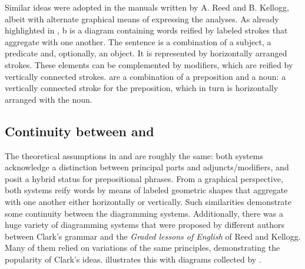 \documentclass[output=paper]{langsci/langscibook}
\begin{document}
Similar ideas were adopted in the manuals written by A. Reed and B. Kellogg, albeit with alternate graphical means of expressing the analyses. As already highlighted in , b is a diagram containing words reified by labeled strokes that aggregate with one another. The sentence is a combination of a subject, a predicate and, optionally, an object. It is represented by horizontally arranged strokes. These elements can be complemented by modifiers, which are reified by vertically connected strokes.  are a combination of a preposition and a noun: a vertically connected stroke for the preposition, which in turn is horizontally arranged with the noun. 

\subsection{Continuity between \citet{clark_science_1847} and \citet{reed_graded_1879}}\label{sec:4:3.2}

The theoretical assumptions in \citet{clark_science_1847} and \citet{reed_graded_1879} are roughly the same: both systems acknowledge a distinction between principal parts and adjuncts/modifiers, and posit a hybrid status for prepositional phrases. From a graphical perspective, both systems reify words by means of labeled geometric shapes that aggregate with one another either horizontally or vertically. Such similarities demonstrate some continuity between the diagramming systems. Additionally, there was a huge variety of diagramming systems that were proposed by different authors between Clark’s grammar and the \textit{Graded lessons of English} of Reed and Kellogg. Many of them relied on variations of the same principles, demonstrating the popularity of Clark’s ideas.  illustrates this with diagrams collected by \citet{brittain_critical_1973}.
\end{document}

